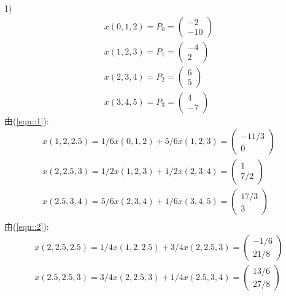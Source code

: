 \documentclass{article}
\begin{document}
	1)\\
	\begin{equation}\label{equ::1}
		\begin{aligned}
			x(0,1,2)=P_0=\left(\begin{array}{c} -2\\-10 \end{array}\right)\\
			x(1,2,3)=P_1=\left(\begin{array}{c}	-4\\2 \end{array}\right)\\
			x(2,3,4)=P_2=\left(\begin{array}{c}	6\\5 \end{array}\right)\\
			x(3,4,5)=P_3=\left(\begin{array}{c}	4\\-7 \end{array}\right)
		\end{aligned}
	\end{equation}
	由(\ref{equ::1}):
	\begin{equation}\label{equ::2}
		\begin{aligned}
			x(1,2,2.5)=1/6x(0,1,2)+5/6x(1,2,3)=\left(\begin{array}{c} -11/3\\0 \end{array}\right)\\
			x(2,2.5,3)=1/2x(1,2,3)+1/2x(2,3,4)=\left(\begin{array}{c}	1\\7/2 \end{array}\right)\\
			x(2.5,3,4)=5/6x(2,3,4)+1/6x(3,4,5)=\left(\begin{array}{c}	17/3\\3 \end{array}\right)\\
		\end{aligned}
	\end{equation}
	由(\ref{equ::2}):
	\begin{equation}\label{equ::3}
		\begin{aligned}
			x(2,2.5,2.5)=1/4x(1,2,2.5)+3/4x(2,2.5,3)=\left(\begin{array}{c} -1/6\\21/8 \end{array}\right)\\
			x(2.5,2.5,3)=3/4x(2,2.5,3)+1/4x(2.5,3,4)=\left(\begin{array}{c}	13/6\\27/8 \end{array}\right)\\
		\end{aligned}
	\end{equation}
\end{document}
